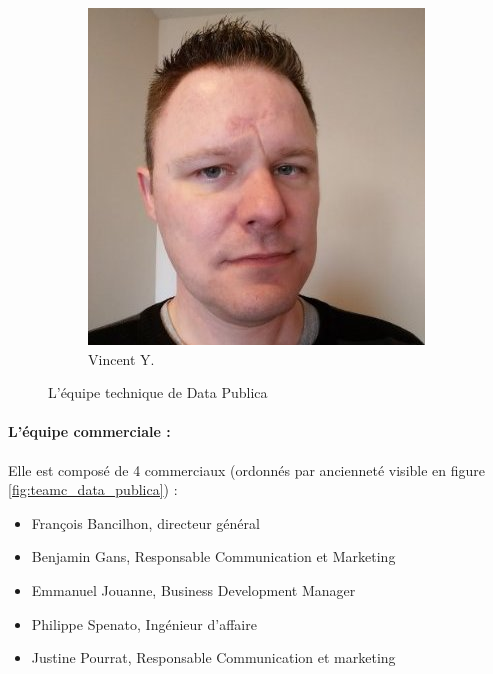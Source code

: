 \begin{figure}[h!]
\begin{subfigure}[b]{0.2\textwidth}
                \includegraphics[width=\textwidth]{images/vincent.jpg}
                \caption{Vincent Y.}
            \end{subfigure}
            \caption{L'équipe technique de Data Publica}
            \label{fig:teamd_data_publica}
        \end{figure}

        \paragraph{L'équipe commerciale :}
            Elle est composé de 4 commerciaux (ordonnés par ancienneté visible en figure \ref{fig:teamc_data_publica}) :
            \begin{itemize}
                \item François Bancilhon, directeur général
                \item Benjamin Gans, Responsable Communication et Marketing
                \item Emmanuel Jouanne, Business Development Manager
                \item Philippe Spenato, Ingénieur d'affaire
                \item Justine Pourrat, Responsable Communication et marketing
            \end{itemize}

